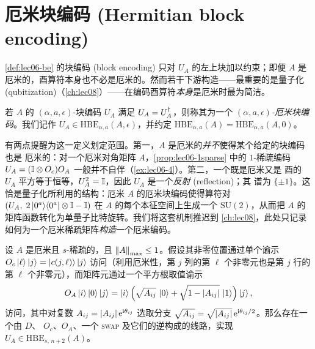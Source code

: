 \section{厄米块编码 (Hermitian block encoding)}
\label{sec:lec06-4}

\cref{def:lec06-be} 的块编码 (block encoding) 只对 $U_A$ 的左上块加以约束；即便 $A$
是厄米的，酉算符本身也不必是厄米的。然而若干下游构造——最重要的是量子化
(qubitization)（\cref{ch:lec08}）——在编码酉算符\emph{本身}是厄米时最为简洁。

\begin{definition}[厄米块编码]
\label{def:lec06-hbe}
若 $A$ 的 $(\alpha,a,\epsilon)$-块编码 $U_A$ 满足 $U_A=U_A^{\dagger}$，则称其为一个
\emph{$(\alpha,a,\epsilon)$-厄米块编码}。我们记作
$U_A\in\mathrm{HBE}_{\alpha,a}(A,\epsilon)$，并约定
$\mathrm{HBE}_{\alpha,a}(A)=\mathrm{HBE}_{\alpha,a}(A,0)$。
\end{definition}

有两点提醒为这一定义划定范围。第一，$A$ 是厄米的\emph{并不}使得某个给定的块编码也是
厄米的：对一个厄米对角矩阵 $A$，\cref{prop:lec06-1sparse} 中的 $1$-稀疏编码
$U_A=(\mathbb{I}\otimes O_c)O_A$ 一般并不自伴（\cref{ex:lec06-4}）。第二，一个既是厄米又是
酉的 $U_A$ 平方等于恒等，$U_A^2=\mathbb{I}$，因此 $U_A$ 是一个\emph{反射} (reflection)；其
谱为 $\{\pm1\}$。这恰是量子化所利用的结构：厄米 $A$ 的厄米块编码使得算符对
$(U_A,\;2\ket{0^a}\!\bra{0^a}\otimes\mathbb{I}-\mathbb{I})$ 在 $A$ 的每个本征空间上生成一个
$\mathrm{SU}(2)$，从而把 $A$ 的矩阵函数转化为单量子比特旋转。我们将这套机制推迟到
\cref{ch:lec08}，此处只记录如何为一个厄米稀疏矩阵\emph{构造}一个厄米编码。

\begin{theorem}[厄米 $s$-稀疏矩阵的厄米块编码]
\label{thm:lec06-hbe}
设 $A$ 是厄米且 $s$-稀疏的，且 $\left\lVert A \right\rVert_{\max}\le1$。假设其非零位置通过单个谕示
$O_c\ket{\ell}\ket{j}=\ket{c(j,\ell)}\ket{j}$ 访问（利用厄米性，第 $j$ 列的第 $\ell$
个非零元也是第 $j$ 行的第 $\ell$ 个非零元），而矩阵元通过一个平方根取值谕示
\begin{equation}
  O_A\ket{i}\ket{0}\ket{j}
   =\ket{i}\Bigl(\sqrt{A_{ij}}\,\ket{0}+\sqrt{1-\left\lvert A_{ij} \right\rvert}\,\ket{1}\Bigr)\ket{j},
  \label{eq:lec06-OAsqrt}
\end{equation}
访问，其中对复数 $A_{ij}=\left\lvert A_{ij} \right\rvert\mathrm{e}^{\mathrm{i}\theta_{ij}}$ 选取分支
$\sqrt{A_{ij}}=\sqrt{\left\lvert A_{ij} \right\rvert}\,\mathrm{e}^{\mathrm{i}\theta_{ij}/2}$。那么存在一个由 $D$、
$O_c$、$O_A$、一个 \textsc{swap} 及它们的逆构成的线路，实现
$U_A\in\mathrm{HBE}_{s,\,n+2}(A)$。
\end{theorem}

